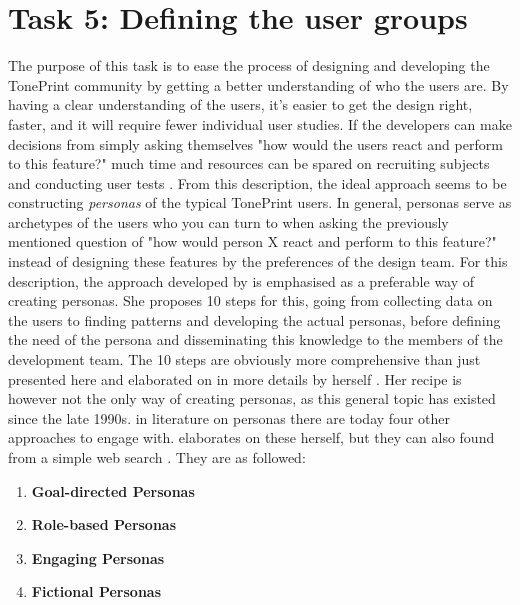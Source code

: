 \section{Task 5: Defining the user groups}
\label{Task5}
The purpose of this task is to ease the process of designing and developing the TonePrint community by getting a better understanding of who the users are. By having a clear understanding of the users, it's easier to get the design right, faster, and it will require fewer individual user studies. If the developers can make decisions from simply asking themselves "how would the users react and perform to this feature?" much time and resources can be spared on recruiting subjects and conducting user tests \parencite{WEB:PersonasIDF}. From this description, the ideal approach seems to be constructing \textit{personas} of the typical TonePrint users. In general, personas serve as archetypes of the users who you can turn to when asking the previously mentioned question of "how would person X react and perform to this feature?" instead of designing these features by the preferences of the design team. For this description, the approach developed by \textcite{WEB:PersonaKilde} is emphasised as a preferable way of creating personas. She proposes 10 steps for this, going from collecting data on the users to finding patterns and developing the actual personas, before defining the need of the persona and disseminating this knowledge to the members of the development team. The 10 steps are obviously more comprehensive than just presented here and elaborated on in more details by \citeauthor{WEB:PersonaKilde} herself \parencite[][9]{WEB:PersonaKilde}. Her recipe is however not the only way of creating personas, as this general topic has existed since the late 1990s. in literature on personas there are today four other approaches to engage with. \citeauthor{WEB:PersonaKilde} elaborates on these herself, but they can also found from a simple web search \parencite{WEB:PersonasIDF}. They are as followed:
%
\begin{enumerate}
    \item \textbf{Goal-directed Personas}
    \item \textbf{Role-based Personas}
    \item \textbf{Engaging Personas}
    \item \textbf{Fictional Personas}
\end{enumerate}
%
\noindent
